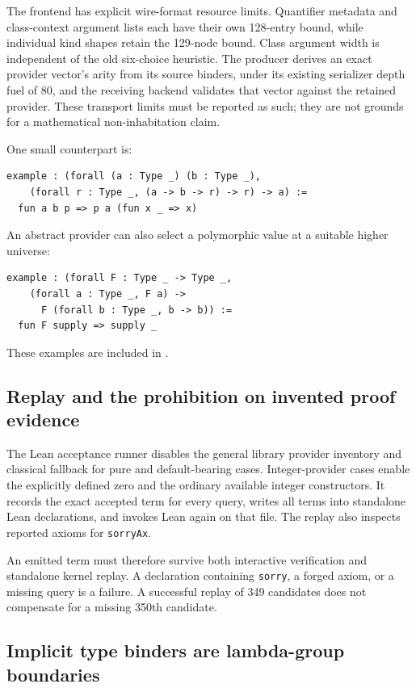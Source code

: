 \documentclass[11pt]{article}
\newcommand{\code}[1]{\texttt{#1}}
\begin{document}
The frontend has explicit wire-format resource limits. Quantifier metadata
and class-context argument lists each have their own 128-entry bound, while
individual kind shapes retain the 129-node bound. Class argument width is
independent of the old six-choice heuristic. The producer derives an exact
provider vector's arity from its source binders, under its existing serializer
depth fuel of 80, and the receiving backend validates that vector against the retained
provider. These transport limits must be reported as such; they are not
grounds for a mathematical non-inhabitation claim.

One small counterpart is:
\begin{lstlisting}
example : (forall (a : Type _) (b : Type _),
    (forall r : Type _, (a -> b -> r) -> r) -> a) :=
  fun a b p => p a (fun x _ => x)
\end{lstlisting}
An abstract provider can also select a polymorphic value at a suitable higher
universe:
\begin{lstlisting}
example : (forall F : Type _ -> Type _,
    (forall a : Type _, F a) ->
      F (forall b : Type _, b -> b)) :=
  fun F supply => supply _
\end{lstlisting}
These examples are included in .

\subsection{Replay and the prohibition on invented proof evidence}

The Lean acceptance runner disables the general library provider inventory
and classical fallback for pure and default-bearing cases. Integer-provider
cases enable the explicitly defined zero and the ordinary available integer
constructors. It records the exact accepted term for every query, writes all
terms into standalone Lean declarations, and invokes Lean again on that file.
The replay also inspects reported axioms for \code{sorryAx}.

An emitted term must therefore survive both interactive verification and
standalone kernel replay. A declaration containing \code{sorry}, a forged
axiom, or a missing query is a failure. A successful replay of 349 candidates
does not compensate for a missing 350th candidate.

\subsection{Implicit type binders are lambda-group boundaries}
\end{document}
